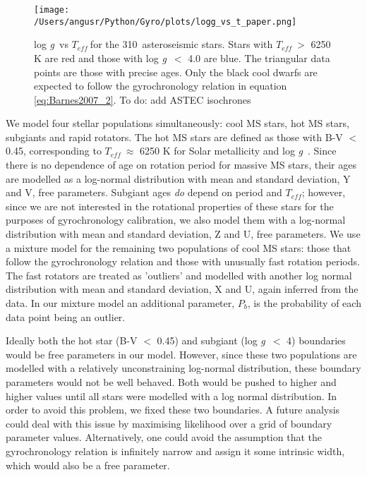 \documentclass[12pt,preprint]{aastex}
\newcommand{\logg}{log \emph{g}~}
\newcommand{\teff}{$T_{eff}~$}
\newcommand{\nastero}{310~}
\begin{document}
\begin{figure}[ht]
\begin{center}
\texttt{[image: /Users/angusr/Python/Gyro/plots/logg\_vs\_t\_paper.png]}
\caption{\logg vs \teff for the \nastero asteroseismic stars. Stars with \teff $>$ 6250 K are red and those with \logg $<$ 4.0 are blue. The triangular data points are those with precise ages. Only the black cool dwarfs are expected to follow the gyrochronology relation in equation \ref{eq:Barnes2007_2}. {\color{red}To do: add ASTEC isochrones}}
\label{fig:p_vs_a}
\end{center}
\end{figure}

We model four stellar populations simultaneously: cool MS stars, hot MS stars, subgiants and rapid rotators.
The hot MS stars are defined as those with B-V $<$ 0.45, corresponding to \teff $\approx$ 6250 K for Solar metallicity and \logg.
Since there is no dependence of age on rotation period for massive MS stars, their ages are modelled as a log-normal distribution with mean and standard deviation, Y and V, free parameters.
Subgiant ages \emph{do} depend on period and $T_{eff}$; however, since we are not interested in the rotational properties of these stars for the purposes of gyrochronology calibration, we also model them with a log-normal distribution with mean and standard deviation, Z and U, free parameters.
We use a mixture model for the remaining two populations of cool MS stars: those that follow the gyrochronology relation and those with unusually fast rotation periods.
The fast rotators are treated as 'outliers' and modelled with another log normal distribution with mean and standard deviation, X and U, again inferred from the data.
In our mixture model an additional parameter, $P_b$, is the probability of each data point being an outlier.

Ideally both the hot star (B-V $<$ 0.45) and subgiant (\logg $<$ 4) boundaries would be free parameters in our model.
However, since these two populations are modelled with a relatively unconstraining log-normal distribution, these boundary parameters would not be well behaved.
Both would be pushed to higher and higher values until all stars were modelled with a log normal distribution.
In order to avoid this problem, we fixed these two boundaries.
A future analysis could deal with this issue by maximising likelihood over a grid of boundary parameter values.
Alternatively, one could avoid the assumption that the gyrochronology relation is infinitely narrow and assign it some intrinsic width, which would also be a free parameter.
\end{document}
